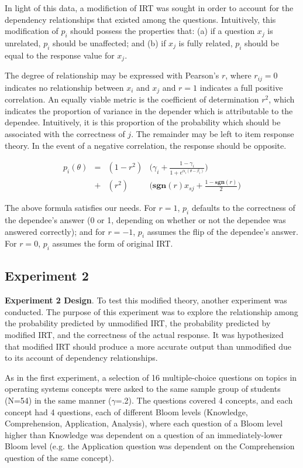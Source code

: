 \documentclass[]{interact}
\theoremstyle{plain}
\theoremstyle{definition}
\theoremstyle{remark}
\begin{document}
In light of this data, a modifiction of IRT was sought in order to account for
the dependency relationships that existed among the questions.  Intuitively,
this modification of $p_i$ should possess the properties that: (a) if a
question $x_j$ is unrelated, $p_i$ should be unaffected; and (b) if $x_j$ is
fully related, $p_i$ should be equal to the response value for $x_j$. 

The degree of relationship may be expressed with Pearson's $r$, where
$r_{ij}=0$ indicates no relationship between $x_i$ and $x_j$ and $r=1$
indicates a full positive correlation.  An equally viable metric is the
coefficient of determination $r^2$, which indicates the proportion of variance
in the depender which is attributable to the dependee.  Intuitively, it is
this proportion of the probability which should be associated with the
correctness of $j$.  The remainder may be left to item response theory.
In the event of a negative correlation, the response should be opposite.


\begin{align*}
  p_i(\theta) &=& (1-r^2) & \Big(\gamma_i + \frac{1-\gamma_i}{1+e^{\alpha_i(\theta-\beta_i)}}\Big) \\
              &+& (r^2)   & \Big(\mathbf{sgn}(r)x_{sj}+\frac{1-\mathbf{sgn}(r)}{2}\Big)
\end{align*}

The above formula satisfies our needs.  For $r=1$, $p_i$ defaults to the
correctness of the dependee's answer (0 or 1, depending on whether or not the
dependee was answered correctly);  and for $r=-1$, $p_i$ assumes the flip of
the dependee's answer.  For $r=0$, $p_i$ assumes the form of original IRT.  

\subsection{Experiment 2}

\textbf{Experiment 2 Design}.  To test this modified theory, another experiment
was conducted.  The purpose of this experiment was to explore the relationship
among the probability predicted by unmodified IRT, the probability predicted by
modified IRT, and the correctness of the actual response.  It was hypothesized
that modified IRT should produce a more accurate output than unmodified due to
its account of dependency relationships.

As in the first experiment, a selection of 16 multiple-choice questions on
topics in operating systems concepts were asked to the same sample group of
students (N=54) in the same manner ($\gamma$=.2).  The questions covered 4
concepts, and each concept had 4 questions, each of different Bloom levels
(Knowledge, Comprehension, Application, Analysis), where each question of a
Bloom level higher than Knowledge was dependent on a question of an
immediately-lower Bloom level (e.g. the Application question was dependent on
the Comprehension question of the same concept).
\end{document}
